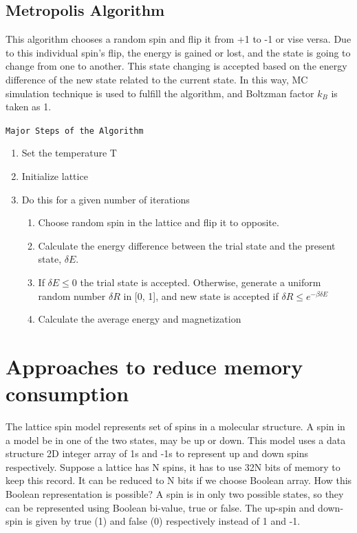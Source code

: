 \documentclass[]{article}
\begin{document}
\subsection{\label{sec:level2.3} Metropolis Algorithm}
This algorithm chooses a random spin and flip it from +1 to -1 or vise versa. Due to this individual spin's flip, the energy is gained or lost, and the state is going to change from one to another. This state changing is accepted based on the energy difference of the new state related to the current state. In this way, MC simulation technique is used to fulfill the algorithm, and Boltzman factor $k_B$ is taken as 1.


\texttt{Major Steps of the Algorithm}
\begin{enumerate}
\item Set the temperature T
\item Initialize lattice
\item Do this for a given number of iterations
\begin{enumerate}
    \item Choose random spin in the lattice and flip it to opposite.
    \item Calculate the energy difference between the trial state and the present state, $\delta E$.
    \item If $\delta E \leq 0$ the trial state is accepted. Otherwise, generate a uniform random number $\delta R $ in [0, 1], and new state is accepted if $\delta R \leq e^{-\beta \delta E} $
    \item Calculate the average energy and magnetization
\end{enumerate}

\end{enumerate}

\section{Approaches to reduce memory consumption}

The lattice spin model represents set of spins in a molecular structure. A spin in a model be in one of the two states, may be up or down. This model uses a data structure 2D integer array of 1s and -1s to represent up and down spins respectively. Suppose a lattice has N spins, it has to use 32N bits of memory to keep this record. It can be reduced to N bits if we choose Boolean array. How this Boolean representation is possible? A spin is in only two possible states, so they can be represented using Boolean bi-value, true or false. The up-spin and down-spin is given by true (1) and false (0) respectively instead of 1 and -1.
\end{document}
